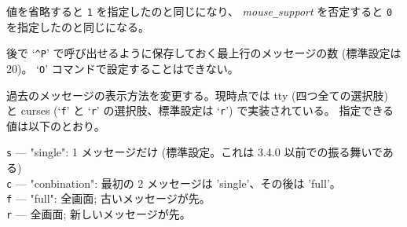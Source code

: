 値を省略すると {\tt 1} を指定したのと同じになり、
{\it mouse\verb+_+support\/} を否定すると
{\tt 0} を指定したのと同じになる。
\item[\ib{msghistory}]
後で `{\tt \^{}P}' で呼び出せるように保存しておく最上行のメッセージの数
(標準設定は 20)。
`{\tt O}' コマンドで設定することはできない。
\item[\ib{msg\verb+_+window}]
過去のメッセージの表示方法を変更する。現時点では tty 
(四つ全ての選択肢) と curses
(`{\tt f}' と `{\tt r}' の選択肢、標準設定は `{\tt r}')
で実装されている。
指定できる値は以下のとおり。

{\tt s} --- "single": 1 メッセージだけ (標準設定。これは 3.4.0 以前での振る舞いである)\\
{\tt c} --- "conbination": 最初の 2 メッセージは 'single'、その後は 'full'。\\
{\tt f} --- "full": 全画面; 古いメッセージが先。\\
{\tt r} --- 全画面; 新しいメッセージが先。

